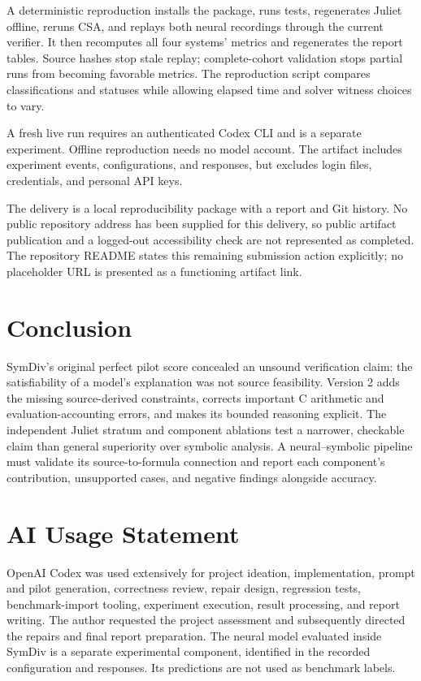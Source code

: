 \documentclass[sigconf]{acmart}
\begin{document}
A deterministic reproduction installs the package, runs tests, regenerates
Juliet offline, reruns CSA, and replays both neural recordings through the
current verifier. It then recomputes all four systems' metrics and regenerates
the report tables. Source hashes stop stale replay; complete-cohort validation
stops partial runs from becoming favorable metrics. The reproduction script
compares classifications and statuses while allowing elapsed time and solver
witness choices to vary.

A fresh live run requires an authenticated Codex CLI and is a separate
experiment. Offline reproduction needs no model account. The artifact includes
experiment events, configurations, and responses, but excludes login files,
credentials, and personal API keys.

\ReproductionSummary{}
The delivery is a local reproducibility package with a report and Git history.
No public repository address has been supplied for this delivery, so public
artifact publication and a logged-out accessibility check are not represented
as completed. The repository README states this remaining submission action
explicitly; no placeholder URL is presented as a functioning artifact link.

\section{Conclusion}
SymDiv's original perfect pilot score concealed an unsound verification claim:
the satisfiability of a model's explanation was not source feasibility. Version
2 adds the missing source-derived constraints, corrects important C arithmetic
and evaluation-accounting errors, and makes its bounded reasoning explicit.
The independent Juliet stratum and component ablations test a narrower,
checkable claim than general superiority over symbolic analysis.
\ConclusionResults{}
A neural--symbolic pipeline must validate its source-to-formula connection
and report each component's contribution, unsupported cases, and negative
findings alongside accuracy.

\section*{AI Usage Statement}
OpenAI Codex was used extensively for project ideation, implementation, prompt
and pilot generation, correctness review, repair design, regression tests,
benchmark-import tooling, experiment execution, result processing, and report
writing. The author requested the project assessment and subsequently directed
the repairs and final report preparation. The neural model evaluated inside
SymDiv is a separate experimental component, identified in the recorded
configuration and responses. Its predictions are not used as benchmark labels.
\end{document}

